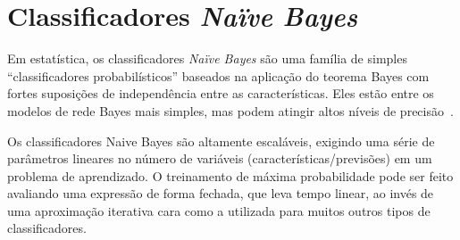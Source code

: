 \section{Classificadores \textit{Naïve Bayes}}
\label{sec:fun:nb}

Em estatística, os classificadores \textit{Naïve Bayes} são uma família de simples ``classificadores probabilísticos'' baseados na aplicação do teorema Bayes com fortes suposições de independência entre as características.
Eles estão entre os modelos de rede Bayes mais simples, mas podem atingir altos níveis de precisão~\cite{bayes,elementsofstatisticallearning}.

Os classificadores Naive Bayes são altamente escaláveis, exigindo uma série de parâmetros lineares no número de variáveis (características/previsões) em um problema de aprendizado.
O treinamento de máxima probabilidade pode ser feito avaliando uma expressão de forma fechada, que leva tempo linear, ao invés de uma aproximação iterativa cara como a utilizada para muitos outros tipos de classificadores.

